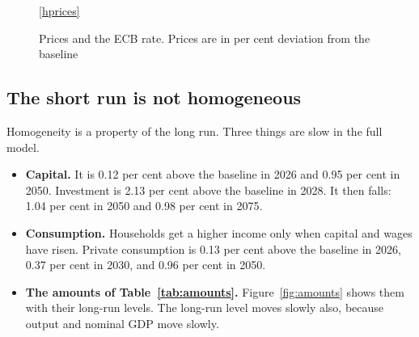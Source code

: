 \documentclass[11pt,a4paper]{article}
\begin{document}
\begin{figure}[H]
\centering
{}

\ref{hprices}
\caption{Prices and the ECB rate. Prices are in per cent deviation from the baseline}
\label{fig:prices}
\end{figure}

\subsection{The short run is not homogeneous}
\label{sec:slow}

Homogeneity is a property of the long run. Three things are slow in the full model.

\begin{itemize}
\item \textbf{Capital.} It is 0.12 per cent above the baseline in 2026 and 0.95 per cent in 2050. Investment is 2.13 per cent above the baseline in 2028. It then falls: 1.04 per cent in 2050 and 0.98 per cent in 2075.
\item \textbf{Consumption.} Households get a higher income only when capital and wages have risen. Private consumption is 0.13 per cent above the baseline in 2026, 0.37 per cent in 2030, and 0.96 per cent in 2050.
\item \textbf{The amounts of Table~\ref{tab:amounts}.} Figure~\ref{fig:amounts} shows them with their long-run levels. The long-run level moves slowly also, because output and nominal GDP move slowly.
\end{itemize}
\end{document}
